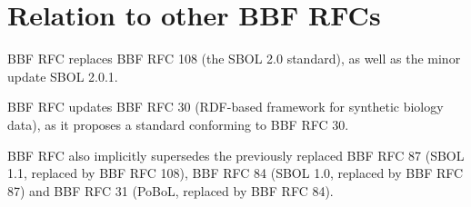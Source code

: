 \section{Relation to other BBF RFCs}

BBF RFC \rfcnum{} replaces BBF RFC 108 (the SBOL 2.0 standard), as well as the minor update SBOL 2.0.1.

BBF RFC \rfcnum{} updates BBF RFC 30 (RDF-based framework for synthetic biology data), as it proposes a standard conforming to BBF RFC 30.

BBF RFC \rfcnum{} also implicitly supersedes the previously replaced BBF RFC 87 (SBOL 1.1, replaced by BBF RFC 108), BBF RFC 84 (SBOL 1.0, replaced by BBF RFC 87) and BBF RFC 31 (PoBoL, replaced by BBF RFC 84).
